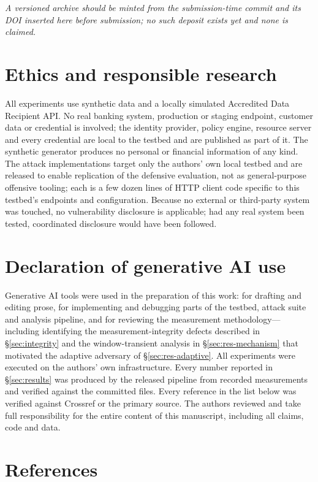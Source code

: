 \textit{A versioned archive should be minted from the submission-time commit and its DOI inserted here before submission; no such deposit exists yet and none is claimed.}

\section*{Ethics and responsible research}

All experiments use synthetic data and a locally simulated Accredited Data Recipient API. No real banking system, production or staging endpoint, customer data or credential is involved; the identity provider, policy engine, resource server and every credential are local to the testbed and are published as part of it. The synthetic generator produces no personal or financial information of any kind. The attack implementations target only the authors' own local testbed and are released to enable replication of the defensive evaluation, not as general-purpose offensive tooling; each is a few dozen lines of HTTP client code specific to this testbed's endpoints and configuration. Because no external or third-party system was touched, no vulnerability disclosure is applicable; had any real system been tested, coordinated disclosure would have been followed.

\section*{Declaration of generative AI use}

Generative AI tools were used in the preparation of this work: for drafting and editing prose, for implementing and debugging parts of the testbed, attack suite and analysis pipeline, and for reviewing the measurement methodology---including identifying the measurement-integrity defects described in \S\ref{sec:integrity} and the window-transient analysis in \S\ref{sec:res-mechanism} that motivated the adaptive adversary of \S\ref{sec:res-adaptive}. All experiments were executed on the authors' own infrastructure. Every number reported in \S\ref{sec:results} was produced by the released pipeline from recorded measurements and verified against the committed files. Every reference in the list below was verified against Crossref or the primary source. The authors reviewed and take full responsibility for the entire content of this manuscript, including all claims, code and data.

\section*{References}

